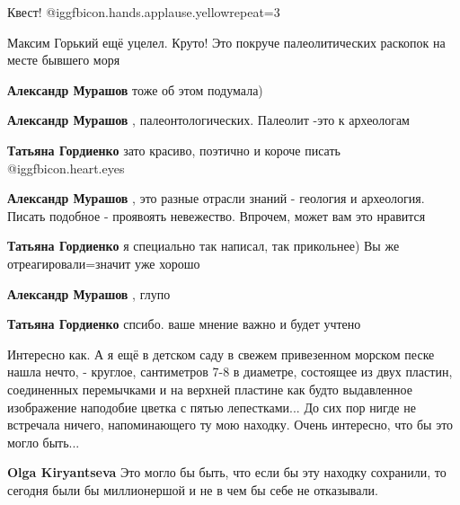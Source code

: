  
 
 
 
 
\zzSecCmt

\begin{itemize} %
Квест! @igg{fbicon.hands.applause.yellow}{repeat=3} 

Максим Горький ещё уцелел. Круто! Это покруче палеолитических раскопок на месте бывшего моря

\begin{itemize} %
\textbf{Александр Мурашов} тоже об этом подумала)

\textbf{Александр Мурашов} , палеонтологических. Палеолит -это к археологам

\textbf{Татьяна Гордиенко} зато красиво, поэтично и короче писать @igg{fbicon.heart.eyes} 

\textbf{Александр Мурашов} , это разные отрасли знаний - геология и археология.
Писать подобное - проявоять невежество. Впрочем, может вам это нравится

\textbf{Татьяна Гордиенко} я специально так написал, так прикольнее) Вы же отреагировали=значит уже хорошо

\textbf{Александр Мурашов} , глупо

\textbf{Татьяна Гордиенко} спсибо. ваше мнение важно и будет учтено
\end{itemize} %


Интересно как. А я ещё в детском саду в свежем привезенном морском песке нашла
нечто, - круглое, сантиметров 7-8 в диаметре, состоящее из двух пластин,
соединенных перемычками и на верхней пластине как будто выдавленное изображение
наподобие цветка с пятью лепестками... До сих пор нигде не встречала ничего,
напоминающего ту мою находку. Очень интересно, что бы это могло быть...

\begin{itemize} %
\textbf{Olga Kiryantseva} Это могло бы быть, что если бы эту находку сохранили, то сегодня были бы миллионершой и не в чем бы себе не отказывали.


\end{itemize}
\end{itemize}
